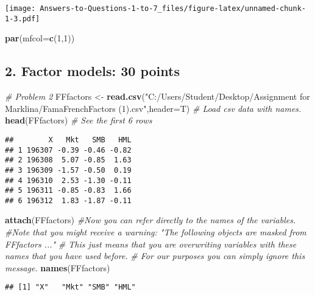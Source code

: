\documentclass[
]{article}
\newenvironment{Shaded}{\begin{snugshade}}{\end{snugshade}}
\newcommand{\AttributeTok}[1]{\textcolor[rgb]{0.13,0.29,0.53}{#1}}
\newcommand{\CommentTok}[1]{\textcolor[rgb]{0.56,0.35,0.01}{\textit{#1}}}
\newcommand{\DecValTok}[1]{\textcolor[rgb]{0.00,0.00,0.81}{#1}}
\newcommand{\FunctionTok}[1]{\textcolor[rgb]{0.13,0.29,0.53}{\textbf{#1}}}
\newcommand{\NormalTok}[1]{#1}
\newcommand{\OtherTok}[1]{\textcolor[rgb]{0.56,0.35,0.01}{#1}}
\newcommand{\StringTok}[1]{\textcolor[rgb]{0.31,0.60,0.02}{#1}}
\begin{document}
\texttt{[image: Answers-to-Questions-1-to-7\_files/figure-latex/unnamed-chunk-1-3.pdf]}

\begin{Shaded}
\begin{Highlighting}[]
\FunctionTok{par}\NormalTok{(}\AttributeTok{mfcol=}\FunctionTok{c}\NormalTok{(}\DecValTok{1}\NormalTok{,}\DecValTok{1}\NormalTok{))}
\end{Highlighting}
\end{Shaded}

\subsection{2. Factor models: 30 points}\label{factor-models-30-points}

\begin{Shaded}
\begin{Highlighting}[]
\CommentTok{\# Problem 2}
\NormalTok{FFfactors }\OtherTok{\textless{}{-}} \FunctionTok{read.csv}\NormalTok{(}\StringTok{"C:/Users/Student/Desktop/Assignment for Marklina/FamaFrenchFactors (1).csv"}\NormalTok{,}\AttributeTok{header=}\NormalTok{T) }\CommentTok{\# Load csv data with names.}
\FunctionTok{head}\NormalTok{(FFfactors) }\CommentTok{\# See the first 6 rows}
\end{Highlighting}
\end{Shaded}

\begin{verbatim}
##        X   Mkt   SMB   HML
## 1 196307 -0.39 -0.46 -0.82
## 2 196308  5.07 -0.85  1.63
## 3 196309 -1.57 -0.50  0.19
## 4 196310  2.53 -1.30 -0.11
## 5 196311 -0.85 -0.83  1.66
## 6 196312  1.83 -1.87 -0.11
\end{verbatim}

\begin{Shaded}
\begin{Highlighting}[]
\FunctionTok{attach}\NormalTok{(FFfactors) }\CommentTok{\#Now you can refer directly to the names of the variables.}
\CommentTok{\#Note that you might receive a warning: "The following objects are masked from FFfactors ..."}
\CommentTok{\# This just means that you are overwriting variables with these names that you have used before.}
\CommentTok{\# For our purposes you can simply ignore this message.}
\FunctionTok{names}\NormalTok{(FFfactors)}
\end{Highlighting}
\end{Shaded}

\begin{verbatim}
## [1] "X"   "Mkt" "SMB" "HML"
\end{verbatim}
\end{document}
